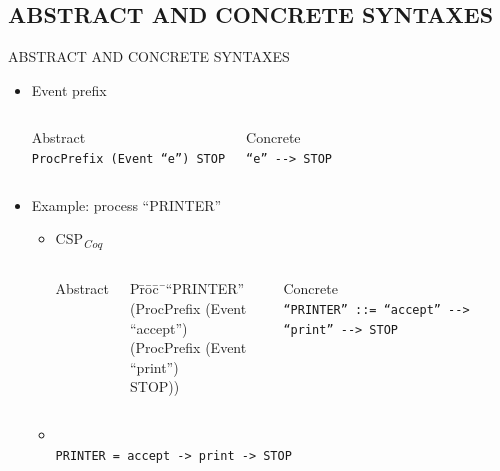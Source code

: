 \documentclass[t]{beamer}
\newcommand{\CSPcoq}{CSP\textsubscript{\textit{Coq}}}
\begin{document}
\subsection{ABSTRACT AND CONCRETE SYNTAXES}

\begin{frame}{ABSTRACT AND CONCRETE SYNTAXES}
	\begin{itemize}
		\item Event prefix
		\begin{columns}
			\centering\small
			Abstract\\
			\texttt{ProcPrefix (Event ``e'') STOP}

			\centering\small
			Concrete\\
			\texttt{``e'' -{}-> STOP}
		\end{columns}

		\vspace{3mm}
		\item Example: process ``PRINTER''
		\begin{itemize}
			\item \CSPcoq{}\\
			\vspace{1mm}
			\begin{columns}
				\column{0.5\textwidth}
				\centering\small
				Abstract\\
				\ttfamily
				\begin{tabbing}
					P\=r\=o\=c\=\ ``PRINTER''\\
					\>	(ProcPrefix (Event ``accept'')\\
					\>\>	(ProcPrefix (Event ``print'')\\
					\>\>\>		STOP))
				\end{tabbing}
				\normalfont

				\column{0.5\textwidth}
				\centering\small
				Concrete\\
				\texttt{``PRINTER'' ::= ``accept'' -{}-> ``print'' -{}-> STOP}
			\end{columns}
			\vspace{1mm}
			\item \CSPM{}\\
			\texttt{PRINTER = accept -> print -> STOP}
		\end{itemize}
	\end{itemize}
\end{frame}
\end{document}
